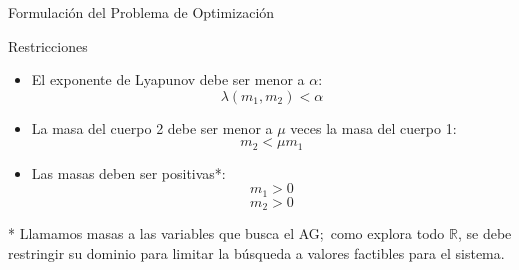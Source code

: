 \begin{frame}{Formulación del Problema de Optimización}
\begin{block}{Restricciones}
  \begin{itemize}
      \item El exponente de Lyapunov debe ser menor a $\alpha$:
      $$ \lambda(m_1, m_2) < \alpha $$ %
      \item La masa del cuerpo 2 debe ser menor a $\mu$ veces la masa del cuerpo 1:
      $$ m_2 < \mu m_1 $$ %
      \item Las masas deben ser positivas*:
      $$ m_1 > 0 $$ %
      $$ m_2 > 0 $$ %
  \end{itemize}
  \vspace{0cm}
  \tiny{* Llamamos masas a las variables que busca el AG;\ como explora todo $\mathbb{R}$, se debe restringir su dominio para limitar la búsqueda a valores factibles para el sistema.}
\end{block}

\end{frame}